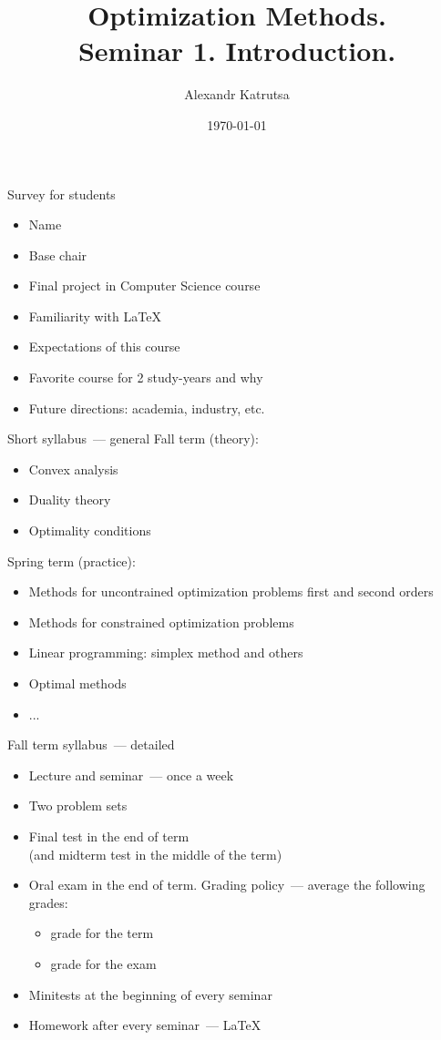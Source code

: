 \documentclass[12pt]{beamer}
\title[Seminar 1]{Optimization Methods. \\
Seminar 1. Introduction.}
\author{Alexandr Katrutsa}
\institute{Moscow Institute of Physics and Technology\\
Department of Control and Applied Mathematics}
\date{\today}
\begin{document}
\begin{frame}
\titlepage
\end{frame}

\begin{frame}{Survey for students}
\begin{itemize}
\item Name
\item Base chair
\item Final project in Computer Science course
\item Familiarity with \LaTeX
\item Expectations of this course
\item Favorite course for 2 study-years and why
\item Future directions: academia, industry, etc.
\end{itemize}

\end{frame}

\begin{frame}{Short syllabus~--- general}
Fall term (theory):
\begin{itemize}
\item Convex analysis
\item Duality theory
\item Optimality conditions
\end{itemize}

Spring term (practice):
\begin{itemize}
\item Methods for uncontrained optimization problems first and second orders
\item Methods for constrained optimization problems
\item Linear programming: simplex method and others
\item Optimal methods
\item ...
\end{itemize}
\end{frame}

\begin{frame}{Fall term syllabus~--- detailed}
\begin{itemize}
\item Lecture and seminar~--- once a week
\item Two problem sets
\item Final test in the end of term \\ (and midterm test in the middle of the term)
\item Oral exam in the end of term. 
Grading policy~--- average the following grades:
\begin{itemize}
\item grade for the term 
\item grade for the exam
\end{itemize}
\item Minitests at the beginning of every seminar 
\item Homework after every seminar~--- \LaTeX
\end{itemize}
\end{frame}
\end{document}
